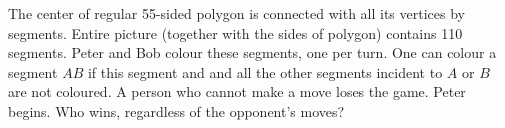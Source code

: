 \problem
The center of regular 55-sided polygon is connected with all its vertices by
segments.
Entire picture (together with the sides of polygon) contains 110 segments.
Peter and Bob colour these segments, one per turn.
One can colour a segment $AB$ if this segment and and all the other segments
incident to $A$ or $B$ are not coloured.
A person who cannot make a move loses the game.
Peter begins.
Who wins, regardless of the opponent's moves?

\solution

\endproblem
